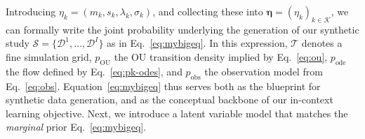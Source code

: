 Introducing $\eta_k = (m_k,s_k,\lambda_k,\sigma_k)$, and collecting these into $\boldsymbol{\eta}= (\eta_k)_{k\in\mathcal{K}}$, 
%
we can formally write the joint probability underlying the generation of our synthetic study $\mathcal{S}=\{\mathcal{D}^{1},\dots,\mathcal{D}^{I}\}$ as in Eq.~\ref{eq:mybigeq}.
%
In this expression, $\mathcal{T}$ denotes a fine simulation grid, 
%
$p_{\text{OU}}$ the OU transition density implied by Eq.~\ref{eq:ou},
%
$p_{\text{ode}}$ the flow defined by Eq.~\ref{eq:pk-odes}, and  
$p_{\text{obs}}$ the observation model from Eq.~\ref{eq:obs}. 
%
Equation~\eqref{eq:mybigeq} thus serves both as the blueprint for synthetic data generation, and as the conceptual backbone of our in-context learning objective.
%
Next, we introduce a latent variable model that matches the \textit{marginal} prior Eq.~\eqref{eq:mybigeq}.


